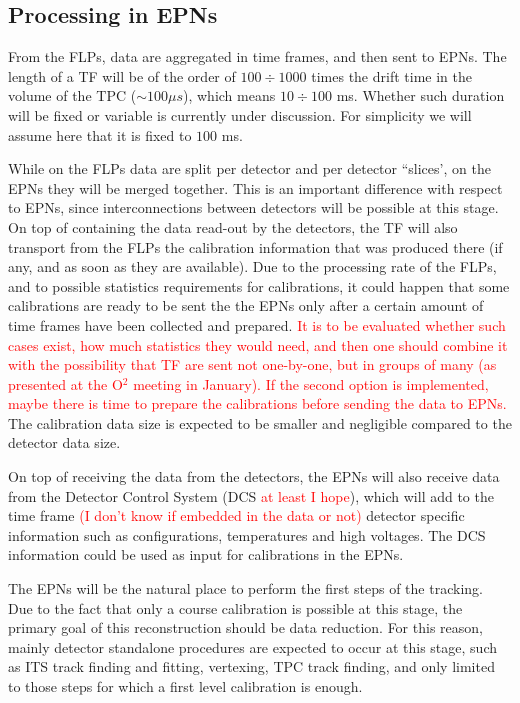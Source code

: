 \subsection{Processing in EPNs}
\label{sec:Processing in EPNs}
From the FLPs, data are aggregated in time frames, and then sent to EPNs. The length of a TF will be of the order of
$100 \div 1000$ times the drift time in the volume of the TPC ($\sim 100 \mu s$), which means $10 \div 100$ ms. Whether such
duration will be fixed or variable is currently under discussion. For simplicity we will assume here that it is fixed to 
$100$ ms. 

While on the FLPs data are split per detector and per detector ``slices', on the EPNs they will be merged together. 
This is an important difference with respect to EPNs, since interconnections between detectors will be possible at this 
stage. On top of containing the data read-out by the detectors, the TF will also transport from the FLPs the calibration
information that was produced there (if any, and as soon as they are available). Due to the processing rate of the FLPs,
and to possible statistics requirements for calibrations, it could happen that some calibrations are ready to be sent 
the the EPNs only after a certain amount of time frames have been collected and prepared. \textcolor{red}{It is to be evaluated 
whether such cases exist, how much statistics they would need, and then one should combine it with the possibility
that TF are sent not one-by-one, but in groups of many (as presented at the O$^2$ meeting in January). If the second
option is implemented, maybe there is time to prepare the calibrations before sending the data to EPNs.} The calibration
data size is expected to be smaller and negligible compared to the detector data size.

On top of receiving the data from the detectors, the EPNs will also 
receive data from
the Detector Control System (DCS
\textcolor{red}{at least I hope}), which will add to the time frame \textcolor{red}{(I don't know if embedded
in the data or not)} detector specific information such as configurations, temperatures and high voltages. The DCS 
information could be used as input for calibrations in the EPNs. 

The EPNs will be the natural place to perform the first steps of the 
tracking. Due to the fact that only a course
calibration is possible at this stage, the primary goal of this reconstruction should be data reduction. For this reason, 
mainly detector standalone procedures are expected to occur at this stage, such as ITS track finding and fitting, 
vertexing, TPC track finding, and only limited to those steps for which a first level calibration is enough. 

